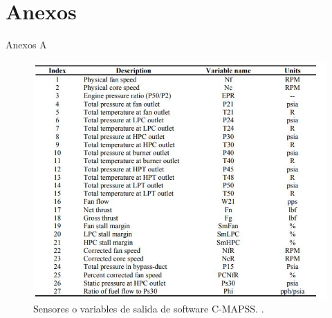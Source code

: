 \documentclass[aspectratio=169]{beamer}
\begin{document}







\section{Anexos}
\begin{frame}{Anexos A}
    \begin{figure}
        \centering
        \includegraphics[scale=0.5]{animate/sensores.png}
        \caption{Sensores o variables de salida de software C-MAPSS. \cite{turbofan_nasa}.}
        \label{fig:my_label}
    \end{figure}
\end{frame}
\end{document}
